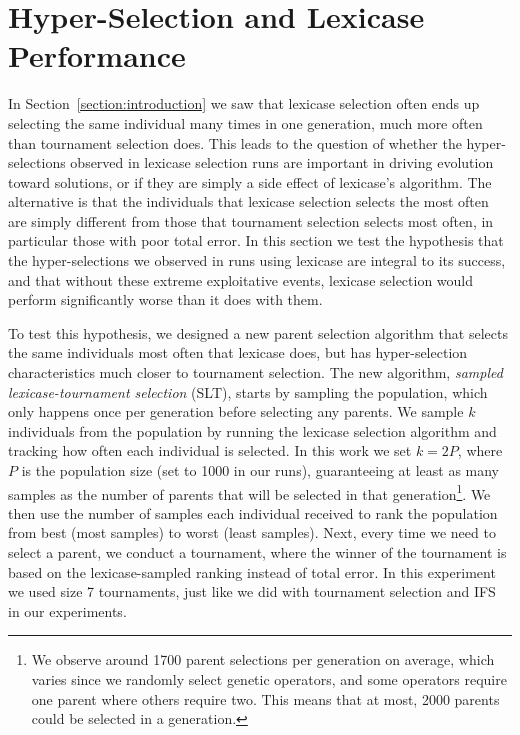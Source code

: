 \documentclass{sig-alternate}
\newcommand{\definition}[1]{\textit{#1}}
\begin{document}
\section{Hyper-Selection and Lexicase Performance}
\label{section:HyperSelectionandLexicasePerformance}

In Section~\ref{section:introduction} we saw that lexicase selection often ends up selecting the same individual many times in one generation, much more often than tournament selection does. This leads to the question of whether the hyper-selections observed in lexicase selection runs are important in driving evolution toward solutions, or if they are simply a side effect of lexicase's algorithm. The alternative is that the individuals that lexicase selection selects the most often are simply different from those that tournament selection selects most often, in particular those with poor total error. In this section we test the hypothesis that the hyper-selections we observed in runs using lexicase are integral to its success, and that without these extreme exploitative events, lexicase selection would perform significantly worse than it does with them.

To test this hypothesis, we designed a new parent selection algorithm that selects the same individuals most often that lexicase does, but has hyper-selection characteristics much closer to tournament selection. The new algorithm, \definition{sampled lexicase-tournament selection} (SLT), starts by sampling the population, which only happens once per generation before selecting any parents. We sample $k$ individuals from the population by running the lexicase selection algorithm and tracking how often each individual is selected. In this work we set $k = 2P$, where $P$ is the population size (set to 1000 in our runs), guaranteeing at least as many samples as the number of parents that will be selected in that generation\footnote{We observe around 1700 parent selections per generation on average, which varies since we randomly select genetic operators, and some operators require one parent where others require two. This means that at most, 2000 parents could be selected in a generation.}. We then use the number of samples each individual received to rank the population from best (most samples) to worst (least samples). Next, every time we need to select a parent, we conduct a tournament, where the winner of the tournament is based on the lexicase-sampled ranking instead of total error. In this experiment we used size 7 tournaments, just like we did with tournament selection and IFS in our experiments.
\end{document}
